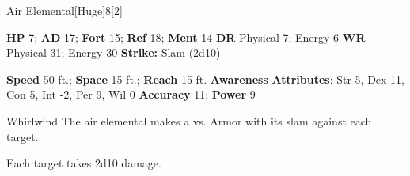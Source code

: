   \begin{monsection}{Air Elemental}[Huge]{8}[2]
    \vspace{-1em}\vspace{-1em}
    \begin{spellcontent}
      \begin{spelltargetinginfo}
        \pari \textbf{HP} 7;
          \textbf{AD} 17;
          \textbf{Fort} 15;
          \textbf{Ref} 18;
          \textbf{Ment} 14
        \pari \textbf{DR} Physical 7; Energy 6
        \pari \textbf{WR} Physical 31; Energy 30
        \pari \textbf{Strike:}
            Slam  (2d10)
      \end{spelltargetinginfo}
    \end{spellcontent}
    \begin{monsterfooter}
      \pari \textbf{Speed} 50 ft.;
        \textbf{Space} 15 ft.;
        \textbf{Reach} 15 ft.
      \pari \textbf{Awareness} 
      \pari \textbf{Attributes}:
        Str 5, Dex 11, Con 5,
        Int -2, Per 9, Wil 0
      \pari \textbf{Accuracy} 11;
        \textbf{Power} 9
    \end{monsterfooter}
  \end{monsection}
  \begin{freeability}{Whirlwind}
      The air elemental makes a 
         vs. Armor
        with its slam against each target.
    
    \hit Each target takes 2d10  damage.
    \end{freeability}
  
